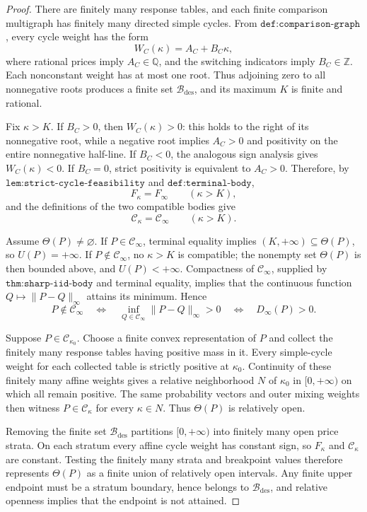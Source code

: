 \documentclass{article}
\begin{document}
\begin{proof}
There are finitely many response tables, and each finite comparison multigraph has finitely many directed simple cycles.  From \(\texttt{def:comparison-graph}\), every cycle weight has the form
\[
 W_C(\kappa)=A_C+B_C\kappa,
\]
where rational prices imply \(A_C\in\mathbb Q\), and the switching indicators imply \(B_C\in\mathbb Z\).  Each nonconstant weight has at most one root.  Thus adjoining zero to all nonnegative roots produces a finite set \(\mathcal B_{\mathrm{des}}\), and its maximum \(K\) is finite and rational.

Fix \(\kappa>K\).  If \(B_C>0\), then \(W_C(\kappa)>0\): this holds to the right of its nonnegative root, while a negative root implies \(A_C>0\) and positivity on the entire nonnegative half-line.  If \(B_C<0\), the analogous sign analysis gives \(W_C(\kappa)<0\).  If \(B_C=0\), strict positivity is equivalent to \(A_C>0\).  Therefore, by \(\texttt{lem:strict-cycle-feasibility}\) and \(\texttt{def:terminal-body}\),
\[
 F_\kappa=F_\infty\qquad(\kappa>K),
\]
and the definitions of the two compatible bodies give
\[
 \mathcal C_\kappa=\mathcal C_\infty\qquad(\kappa>K).
\]

Assume \(\Theta(P)\ne\varnothing\).  If \(P\in\mathcal C_\infty\), terminal equality implies \((K,+\infty)\subseteq\Theta(P)\), so \(U(P)=+\infty\).  If \(P\notin\mathcal C_\infty\), no \(\kappa>K\) is compatible; the nonempty set \(\Theta(P)\) is then bounded above, and \(U(P)<+\infty\).  Compactness of \(\mathcal C_\infty\), supplied by \(\texttt{thm:sharp-iid-body}\) and terminal equality, implies that the continuous function \(Q\mapsto\|P-Q\|_\infty\) attains its minimum.  Hence
\[
 P\notin\mathcal C_\infty
 \quad\Longleftrightarrow\quad
 \inf_{Q\in\mathcal C_\infty}\|P-Q\|_\infty>0
 \quad\Longleftrightarrow\quad
 D_\infty(P)>0.
\]

Suppose \(P\in\mathcal C_{\kappa_0}\).  Choose a finite convex representation of \(P\) and collect the finitely many response tables having positive mass in it.  Every simple-cycle weight for each collected table is strictly positive at \(\kappa_0\).  Continuity of these finitely many affine weights gives a relative neighborhood \(N\) of \(\kappa_0\) in \([0,+\infty)\) on which all remain positive.  The same probability vectors and outer mixing weights then witness \(P\in\mathcal C_\kappa\) for every \(\kappa\in N\).  Thus \(\Theta(P)\) is relatively open.

Removing the finite set \(\mathcal B_{\mathrm{des}}\) partitions \([0,+\infty)\) into finitely many open price strata.  On each stratum every affine cycle weight has constant sign, so \(F_\kappa\) and \(\mathcal C_\kappa\) are constant.  Testing the finitely many strata and breakpoint values therefore represents \(\Theta(P)\) as a finite union of relatively open intervals.  Any finite upper endpoint must be a stratum boundary, hence belongs to \(\mathcal B_{\mathrm{des}}\), and relative openness implies that the endpoint is not attained.


\end{proof}
\end{document}
